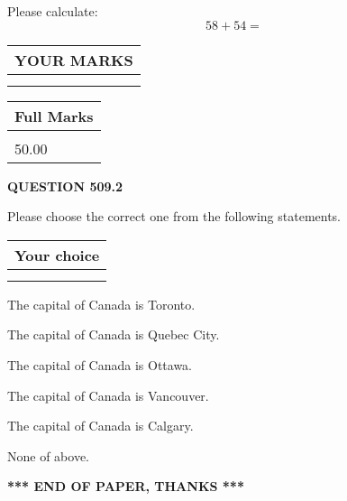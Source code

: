 \documentclass[12pt]{article}
\begin{document}
  
 
Please calculate:
\begin{equation}
58 +  %
54 = \nonumber
\end{equation}
 

 

 
  
\vspace{0.2in}
  
\noindent\begin{tabular}{|l|}
\hline
 YOUR MARKS  \\
\hline
 \\ 
 \\ 
\hline
\end{tabular}
\hspace{0.05in} \begin{tabular}{|l|}
\hline
 Full Marks  \\
\hline
 \\ 
50.00 \\
\hline
\end{tabular}
{\textbf{\Large{QUESTION
509.2 
}}}
  
  
Please choose the correct one from the following statements.
  
  
\noindent\hspace{3.0in} \begin{tabular}{|l|}
\hline
Your choice \\
\hline
 \\ 
 \\ 
\hline
\end{tabular}
  
  
 
 
The capital of Canada is Toronto.
 
 
The capital of Canada is Quebec City.
 
 
The capital of Canada is Ottawa.
 
 
The capital of Canada is Vancouver.
 
 
The capital of Canada is Calgary.
 
 
 None of above.
 
 
   
   
 \vspace{0.2in}
 
   
   
   
   
\vspace{1.0in} 
{\textbf{\large{ *** END OF PAPER, THANKS *** }}} 
   
\end{document}
